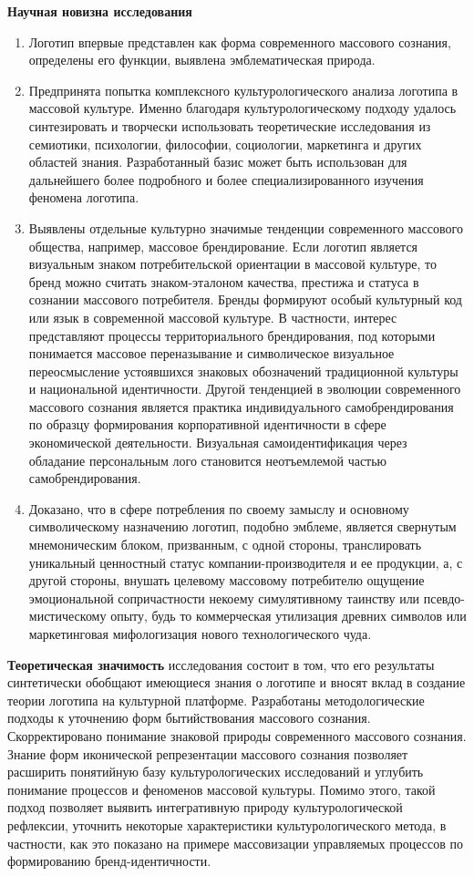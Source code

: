 \textbf{Научная новизна исследования}
\begin{enumerate}
\item Логотип впервые представлен как форма современного массового сознания, определены его функции, выявлена эмблематическая природа. 
\item Предпринята попытка комплексного культурологического анализа логотипа в массовой культуре. Именно благодаря культурологическому подходу удалось синтезировать и творчески использовать теоретические исследования из семиотики, психологии, философии, социологии, маркетинга и других областей знания. Разработанный базис может быть использован для дальнейшего более подробного и более специализированного изучения феномена логотипа. 
\item Выявлены отдельные культурно значимые тенденции современного массового общества, например, массовое брендирование. Если логотип является визуальным знаком потребительской ориентации в массовой культуре, то бренд можно считать знаком-эталоном качества, престижа и статуса в сознании массового потребителя. Бренды формируют особый культурный код или язык в современной массовой культуре. В частности, интерес представляют процессы территориального брендирования, под которыми понимается массовое переназывание и символическое визуальное переосмысление устоявшихся знаковых обозначений традиционной культуры и национальной идентичности. Другой тенденцией в эволюции современного массового сознания является практика индивидуального самобрендирования по образцу формирования корпоративной идентичности в сфере экономической деятельности. Визуальная самоидентификация через обладание персональным лого становится неотъемлемой частью самобрендирования. 
\item Доказано, что в сфере потребления по своему замыслу и основному символическому назначению логотип, подобно эмблеме, является свернутым мнемоническим блоком, призванным, с одной стороны, транслировать уникальный ценностный статус компании-производителя и ее продукции, а, с другой стороны, внушать целевому массовому потребителю ощущение эмоциональной сопричастности некоему симулятивному таинству или псевдо-мистическому опыту, будь то коммерческая утилизация древних символов или маркетинговая мифологизация нового технологического чуда. 
\end{enumerate}

\textbf{Теоретическая значимость} исследования состоит в том, что его результаты синтетически обобщают имеющиеся знания о логотипе и вносят вклад в создание теории логотипа на культурной платформе. Разработаны методологические подходы к уточнению форм бытийствования массового сознания. Скорректировано понимание знаковой природы современного массового сознания. Знание форм иконической репрезентации массового сознания позволяет расширить понятийную базу культурологических исследований и углубить понимание процессов и феноменов массовой культуры. Помимо этого, такой подход позволяет выявить интегративную природу культурологической рефлексии, уточнить некоторые характеристики культурологического метода, в частности, как это показано на примере массовизации управляемых процессов по формированию бренд-идентичности.

